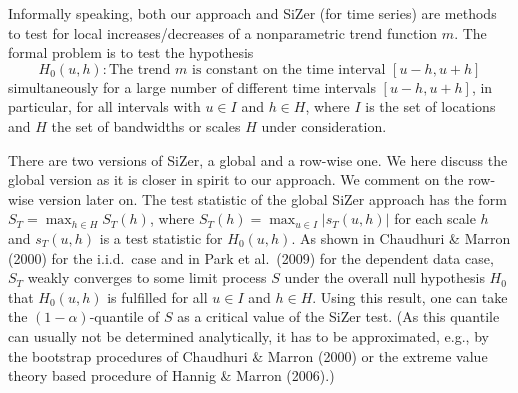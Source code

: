 \documentclass[a4paper,12pt]{article}
\begin{document}
Informally speaking, both our approach and SiZer (for time series) are methods to test for local increases/decreases of a nonparametric trend function $m$. The formal problem is to test the hypothesis
\[ H_0(u,h): \text{The trend } m \text{ is constant on the time interval } [u-h,u+h] \]
simultaneously for a large number of different time intervals $[u-h,u+h]$, in particular, for all intervals with $u \in I$ and $h \in H$, where $I$ is the set of locations and $H$ the set of bandwidths or scales $H$ under consideration. 

There are two versions of SiZer, a global and a row-wise one. We here discuss the global version as it is closer in spirit to our approach. We comment on the row-wise version later on. The test statistic of the global SiZer approach has the form $S_T = \max_{h \in H} S_T(h)$, where $S_T(h) = \max_{u \in I} |s_T(u,h)|$ for each scale $h$ and $s_T(u,h)$ is a test statistic for $H_0(u,h)$. As shown in Chaudhuri \& Marron (2000) for the i.i.d.\ case and in Park et al.\ (2009) for the dependent data case, $S_T$ weakly converges to some limit process $S$ under the overall null hypothesis $H_0$ that $H_0(u,h)$ is fulfilled for all $u \in I$ and $h \in H$. Using this result, one can take the $(1-\alpha)$-quantile of $S$ as a critical value of the SiZer test. (As this quantile can usually not be determined analytically, it has to be approximated, e.g., by the bootstrap procedures of Chaudhuri \& Marron (2000) or the extreme value theory based procedure of Hannig \& Marron (2006).)
\end{document}
